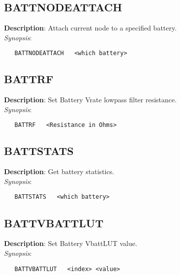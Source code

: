 \subsection{\bf BATTNODEATTACH}
\label{manpages:BATTNODEATTACH}
\label{manpages:battnodeattach}
\vspace{-0.2in}
{\bf Description}: 	Attach current node to a specified battery.\\[1.5ex]
{\em Synopsis}:
\vspace{-0.2in}
\scriptsize
\begin{verbatim}
   BATTNODEATTACH   <which battery>		
\end{verbatim}
\normalsize
\vspace{-0.2in}


\subsection{\bf BATTRF}
\label{manpages:BATTRF}
\label{manpages:battrf}
\vspace{-0.2in}
{\bf Description}: 	Set Battery Vrate lowpass filter resistance.\\[1.5ex]
{\em Synopsis}:
\vspace{-0.2in}
\scriptsize
\begin{verbatim}
   BATTRF   <Resistance in Ohms>	
\end{verbatim}
\normalsize
\vspace{-0.2in}


\subsection{\bf BATTSTATS}
\label{manpages:BATTSTATS}
\label{manpages:battstats}
\vspace{-0.2in}
{\bf Description}: 	Get battery statistics.\\[1.5ex]
{\em Synopsis}:
\vspace{-0.2in}
\scriptsize
\begin{verbatim}
   BATTSTATS   <which battery>					
\end{verbatim}
\normalsize
\vspace{-0.2in}


\subsection{\bf BATTVBATTLUT}
\label{manpages:BATTVBATTLUT}
\label{manpages:battvbattlut}
\vspace{-0.2in}
{\bf Description}: 	Set Battery VbattLUT value.\\[1.5ex]
{\em Synopsis}:
\vspace{-0.2in}
\scriptsize
\begin{verbatim}
   BATTVBATTLUT   <index> <value>				
\end{verbatim}
\normalsize
\vspace{-0.2in}


